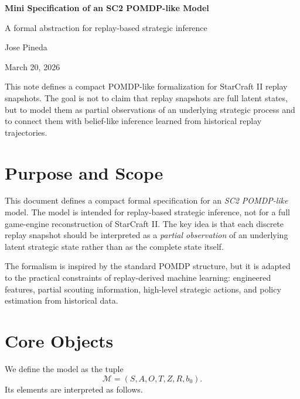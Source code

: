 \documentclass[11pt,a4paper]{article}
\begin{document}
\begin{titlepage}
    \vspace*{2.5cm}
    {\Huge \textbf{Mini Specification of an SC2 POMDP-like Model} \par}
    \vspace{0.8cm}
    {\Large A formal abstraction for replay-based strategic inference \par}
    \vspace{1.2cm}
    {\large Jose Pineda \par}
    \vspace{0.3cm}
    {\large March 20, 2026 \par}
    \vfill
    \noindent\colorbox{accent!8}{\parbox{\dimexpr\textwidth-2\fboxsep\relax}{
    \textcolor{textgray}{This note defines a compact POMDP-like formalization for StarCraft II replay snapshots. The goal is not to claim that replay snapshots are full latent states, but to model them as partial observations of an underlying strategic process and to connect them with belief-like inference learned from historical replay trajectories.}}}
    \vfill
\end{titlepage}

\onehalfspacing

\section{Purpose and Scope}
This document defines a compact formal specification for an \emph{SC2 POMDP-like} model. The model is intended for replay-based strategic inference, not for a full game-engine reconstruction of StarCraft II. The key idea is that each discrete replay snapshot should be interpreted as a \emph{partial observation} of an underlying latent strategic state rather than as the complete state itself.

The formalism is inspired by the standard POMDP structure, but it is adapted to the practical constraints of replay-derived machine learning: engineered features, partial scouting information, high-level strategic actions, and policy estimation from historical data.

\section{Core Objects}
We define the model as the tuple
\[
\mathcal{M} = (S, A, O, T, Z, R, b_0).
\]
Its elements are interpreted as follows.
\end{document}
